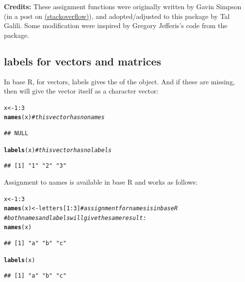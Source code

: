 \documentclass[shortnames,nojss,article]{jss}\usepackage[]{graphicx}\usepackage[]{color}
\makeatletter
\newcommand{\hlnum}[1]{\textcolor[rgb]{0.686,0.059,0.569}{#1}}%
\newcommand{\hlcom}[1]{\textcolor[rgb]{0.678,0.584,0.686}{\textit{#1}}}%
\newcommand{\hlopt}[1]{\textcolor[rgb]{0,0,0}{#1}}%
\newcommand{\hlstd}[1]{\textcolor[rgb]{0.345,0.345,0.345}{#1}}%
\newcommand{\hlkwb}[1]{\textcolor[rgb]{0.69,0.353,0.396}{#1}}%
\newcommand{\hlkwd}[1]{\textcolor[rgb]{0.737,0.353,0.396}{\textbf{#1}}}%
\newenvironment{kframe}{%
 \def\at@end@of@kframe{}%
 \ifinner\ifhmode%
  \def\at@end@of@kframe{\end{minipage}}%
  \begin{minipage}{\columnwidth}%
 \fi\fi%
 \def\FrameCommand##1{\hskip\@totalleftmargin \hskip-\fboxsep
 \colorbox{shadecolor}{##1}\hskip-\fboxsep
     \hskip-\linewidth \hskip-\@totalleftmargin \hskip\columnwidth}%
 \MakeFramed {\advance\hsize-\width
   \@totalleftmargin\z@ \linewidth\hsize
   \@setminipage}}%
 {\par\unskip\endMakeFramed%
 \at@end@of@kframe}
\newenvironment{knitrout}{}{} %
\makeatother
\begin{document}
\textbf{Credits:} These assignment functions were originally written by Gavin Simpson (in a post on \href{http://stackoverflow.com/questions/4614223/how-to-have-the-following-work-labelsx-some-value-r-question}{(stackoverflow)}), and adopted/adjusted to this package by Tal Galili. Some modification were inspired by Gregory Jefferis's code from the  package.


\subsection{labels for vectors and matrices}

In base R, for vectors, labels gives the  of the object. And if these are missing, then  will give the vector itself as a character vector:

\begin{knitrout}
\color{fgcolor}\begin{kframe}
\begin{alltt}
\hlstd{x} \hlkwb{<-} \hlnum{1}\hlopt{:}\hlnum{3}
\hlkwd{names}\hlstd{(x)}  \hlcom{# this vector has no names}
\end{alltt}
\begin{verbatim}
## NULL
\end{verbatim}
\begin{alltt}
\hlkwd{labels}\hlstd{(x)}  \hlcom{# this vector has no labels}
\end{alltt}
\begin{verbatim}
## [1] "1" "2" "3"
\end{verbatim}
\end{kframe}
\end{knitrout}


Assignment to names is available in base R and works as follows:

\begin{knitrout}
\color{fgcolor}\begin{kframe}
\begin{alltt}
\hlstd{x} \hlkwb{<-} \hlnum{1}\hlopt{:}\hlnum{3}
\hlkwd{names}\hlstd{(x)} \hlkwb{<-} \hlstd{letters[}\hlnum{1}\hlopt{:}\hlnum{3}\hlstd{]}  \hlcom{# assignment for names is in base R}
\hlcom{# both names and labels will give the same result:}
\hlkwd{names}\hlstd{(x)}
\end{alltt}
\begin{verbatim}
## [1] "a" "b" "c"
\end{verbatim}
\begin{alltt}
\hlkwd{labels}\hlstd{(x)}
\end{alltt}
\begin{verbatim}
## [1] "a" "b" "c"
\end{verbatim}
\end{kframe}
\end{knitrout}
\end{document}
